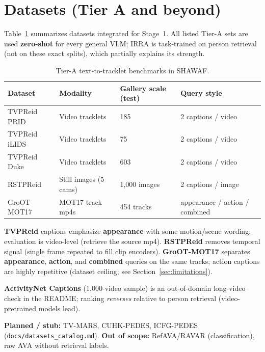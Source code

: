 \documentclass[11pt,a4paper]{article}
\begin{document}
\section{Datasets (Tier A and beyond)}

\label{sec:datasets}

Table~\ref{tab:datasets} summarizes datasets integrated for Stage~1.
All listed Tier-A sets are used \textbf{zero-shot} for every general VLM; IRRA is task-trained on person retrieval (not on these exact splits), which partially explains its strength.

\begin{table}[ht]
\centering
\caption{Tier-A text-to-tracklet benchmarks in SHAWAF.}
\label{tab:datasets}
\begin{tabular}{@{}llll@{}}
\toprule
Dataset & Modality & Gallery scale (test) & Query style \\
\midrule
TVPReid PRID & Video tracklets & 185 & 2 captions / video \\
TVPReid iLIDS & Video tracklets & 75 & 2 captions / video \\
TVPReid Duke & Video tracklets & 603 & 2 captions / video \\
RSTPReid & Still images (5 cams) & 1{,}000 images & 2 captions / image \\
GroOT-MOT17 & MOT17 track mp4s & 454 tracks & appearance / action / combined \\
\bottomrule
\end{tabular}
\end{table}

\textbf{TVPReid} captions emphasize \textbf{appearance} with some motion/scene wording; evaluation is video-level (retrieve the source mp4).
\textbf{RSTPReid} removes temporal signal (single frame repeated to fill clip encoders).
\textbf{GroOT-MOT17} separates \textbf{appearance}, \textbf{action}, and \textbf{combined} queries on the same tracks; action captions are highly repetitive (dataset ceiling; see Section~\ref{sec:limitations}).

\textbf{ActivityNet Captions} (1{,}000-video sample) is an out-of-domain long-video check in the README; ranking \emph{reverses} relative to person retrieval (video-pretrained models lead).

\textbf{Planned / stub:} TV-MARS, CUHK-PEDES, ICFG-PEDES (\texttt{docs/datasets\_catalog.md}).
\textbf{Out of scope:} RefAVA/RAVAR (classification), raw AVA without retrieval labels.
\end{document}
